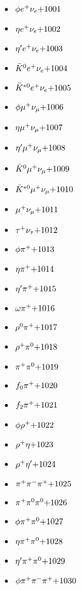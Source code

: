 
 \begin{multicols}{3} 
 \begin{itemize}
 \item $ \phi e^{+} \nu_{e} \hfill{+1001}$
 \item $ \eta e^{+} \nu_{e} \hfill{+1002}$
 \item $ {\eta^{\prime}} e^{+} \nu_{e} \hfill{+1003}$
 \item $ \bar{K}^{0} e^{+} \nu_{e} \hfill{+1004}$
 \item $ \bar{K}^{*0} e^{+} \nu_{e} \hfill{+1005}$
 \item $ \phi \mu^{+} \nu_{\mu} \hfill{+1006}$
 \item $ \eta \mu^{+} \nu_{\mu} \hfill{+1007}$
 \item $ {\eta^{\prime}} \mu^{+} \nu_{\mu} \hfill{+1008}$
 \item $ \bar{K}^{0} \mu^{+} \nu_{\mu} \hfill{+1009}$
 \item $ \bar{K}^{*0} \mu^{+} \nu_{\mu} \hfill{+1010}$
 \item $ \mu^{+} \nu_{\mu} \hfill{+1011}$
 \item $ \tau^{+} \nu_{\tau} \hfill{+1012}$
 \item $ \phi \pi^{+} \hfill{+1013}$
 \item $ \eta \pi^{+} \hfill{+1014}$
 \item $ {\eta^{\prime}} \pi^{+} \hfill{+1015}$
 \item $ \omega \pi^{+} \hfill{+1016}$
 \item $ \rho^{0} \pi^{+} \hfill{+1017}$
 \item $ \rho^{+} \pi^{0} \hfill{+1018}$
 \item $ \pi^{+} \pi^{0} \hfill{+1019}$
 \item $ f_{0} \pi^{+} \hfill{+1020}$
 \item $ f_{2} \pi^{+} \hfill{+1021}$
 \item $ \phi \rho^{+} \hfill{+1022}$
 \item $ \rho^{+} \eta \hfill{+1023}$
 \item $ \rho^{+} {\eta^{\prime}} \hfill{+1024}$
 \item $ \pi^{+} \pi^{-} \pi^{+} \hfill{+1025}$
 \item $ \pi^{+} \pi^{0} \pi^{0} \hfill{+1026}$
 \item $ \phi \pi^{+} \pi^{0} \hfill{+1027}$
 \item $ \eta \pi^{+} \pi^{0} \hfill{+1028}$
 \item $ {\eta^{\prime}} \pi^{+} \pi^{0} \hfill{+1029}$
 \item $ \phi \pi^{+} \pi^{-} \pi^{+} \hfill{+1030}$

\end{itemize}
\end{multicols}
